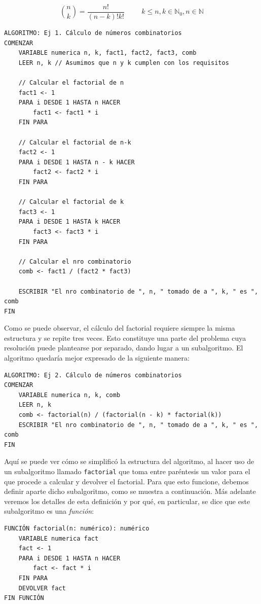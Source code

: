 \documentclass[]{book}
\begin{document}
\[ {{n} \choose {k}} = \frac{n!}{(n-k)!k!} \hspace{1cm} k \le n, k \in \mathbb{N}_0, n \in \mathbb{N}\]

\begin{verbatim}
ALGORITMO: Ej 1. Cálculo de números combinatorios
COMENZAR
    VARIABLE numerica n, k, fact1, fact2, fact3, comb
    LEER n, k // Asumimos que n y k cumplen con los requisitos

    // Calcular el factorial de n
    fact1 <- 1
    PARA i DESDE 1 HASTA n HACER
        fact1 <- fact1 * i
    FIN PARA

    // Calcular el factorial de n-k
    fact2 <- 1
    PARA i DESDE 1 HASTA n - k HACER
        fact2 <- fact2 * i
    FIN PARA

    // Calcular el factorial de k
    fact3 <- 1
    PARA i DESDE 1 HASTA k HACER
        fact3 <- fact3 * i
    FIN PARA

    // Calcular el nro combinatorio
    comb <- fact1 / (fact2 * fact3)

    ESCRIBIR "El nro combinatorio de ", n, " tomado de a ", k, " es ", comb
FIN
\end{verbatim}

Como se puede observar, el cálculo del factorial requiere siempre la
misma estructura y se repite tres veces. Esto constituye una parte del
problema cuya resolución puede plantearse por separado, dando lugar a un
subalgoritmo. El algoritmo quedaría mejor expresado de la siguiente
manera:

\begin{verbatim}
ALGORITMO: Ej 2. Cálculo de números combinatorios
COMENZAR
    VARIABLE numerica n, k, comb
    LEER n, k 
    comb <- factorial(n) / (factorial(n - k) * factorial(k))
    ESCRIBIR "El nro combinatorio de ", n, " tomado de a ", k, " es ", comb
FIN
\end{verbatim}

Aquí se puede ver cómo se simplificó la estructura del algoritmo, al
hacer uso de un subalgoritmo llamado \texttt{factorial} que toma entre
paréntesis un valor para el que procede a calcular y devolver el
factorial. Para que esto funcione, debemos definir aparte dicho
subalgoritmo, como se muestra a continuación. Más adelante veremos los
detalles de esta definición y por qué, en particular, se dice que este
subalgoritmo es una \emph{función}:

\begin{verbatim}
FUNCIÓN factorial(n: numérico): numérico
    VARIABLE numerica fact
    fact <- 1
    PARA i DESDE 1 HASTA n HACER
        fact <- fact * i
    FIN PARA
    DEVOLVER fact
FIN FUNCIÓN
\end{verbatim}
\end{document}
